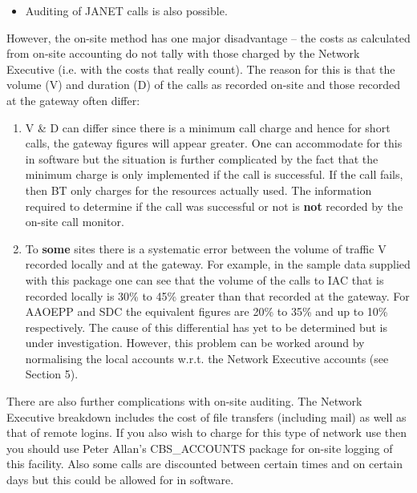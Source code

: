 \begin{enumerate}
\begin{itemize}
\item Auditing of JANET calls is also possible.

\end{itemize}

However, the on-site method has one major disadvantage -- the costs as
calculated from on-site accounting do not tally with those charged by the
Network Executive (i.e. with the costs that really count). The reason for
this is that the volume (V) and duration (D) of the calls as recorded
on-site and those recorded at the gateway often differ:

\begin{enumerate}

\item
V \& D can differ since there is a minimum call charge and hence for short
calls, the gateway figures will appear greater.  One can accommodate for this
in software but the situation is further complicated by the fact that the minimum
charge is only implemented if the call is successful. If the call fails,
then BT only charges for the resources actually used. The information
required to determine if the call was successful or not is {\bf not} recorded by
the on-site call monitor.

\item
To {\bf some} sites there is a systematic error between the volume of traffic V
recorded locally and at the gateway. For example, in the sample data supplied
with this package one can see that the volume of the calls to IAC
that is recorded locally is 30\% to 45\% greater than that recorded at the
gateway. For AAOEPP and SDC the equivalent figures are 20\% to 35\% and up to 10\%
respectively. The cause of this differential has yet to be determined but is
under investigation. However, this problem can be worked around
by normalising the local accounts w.r.t. the Network Executive accounts
(see Section 5).

\end{enumerate}

There are also further complications with on-site auditing. The Network
Executive breakdown includes the cost of file transfers (including mail) as
well as that of remote logins. If you also wish to charge for this type of
network use then you should use Peter Allan's CBS\_\/ACCOUNTS package for
on-site logging of this facility. Also some calls are discounted between
certain times and on certain days but this could be allowed for in software.

\end{enumerate}

